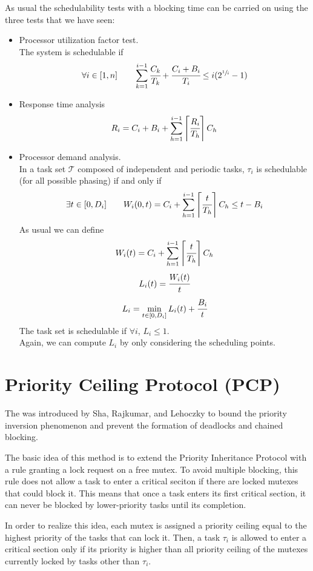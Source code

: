 As usual the schedulability tests with a blocking time can be carried on using the three tests that we have seen:
\begin{itemize}
    \item Processor utilization factor test.\\
    The system is schedulable if
    \[\forall i \in [1,n]\qquad \sum_{k=1}^{i-1}\cfrac{C_k}{T_k} + \cfrac{C_i + B_i}{T_i} \le i(2^{\sfrac{1}{i}} - 1)\]
    \item Response time analysis
    \[R_i = C_i + B_i + \sum_{h=1}^{i-1}\left\lceil \cfrac{R_i}{T_h} \right\rceil C_h\]
    \item Processor demand analysis.\\
    In a task set $\mathcal{T}$ composed of independent and periodic tasks, $\tau_i$ is schedulable (for all possible phasing) if and only if
    \[\exists t\in [0,D_i]\qquad W_i(0,t) = C_i + \sum_{h=1}^{i-1} \left\lceil \cfrac{t}{T_h} \right\rceil C_h \le t-B_i\]
    As usual we can define
    \[W_i(t) =C_i + \sum_{h=1}^{i-1} \left\lceil \cfrac{t}{T_h} \right\rceil C_h\]
    \[L_i(t) = \cfrac{W_i(t)}{t}\]
    \[L_i = \min_{t\in [0,D_i]}L_i(t) + \cfrac{B_i}{t}\]
    The task set is schedulable if $\forall i$, $L_i\le 1$.\\
    Again, we can compute $L_i$ by only considering the scheduling points.
\end{itemize}

\section{Priority Ceiling Protocol (PCP)} %
The  was introduced by Sha, Rajkumar, and Lehoczky to bound the priority inversion phenomenon and prevent the formation of deadlocks and chained blocking.

The basic idea of this method is to extend the Priority Inheritance Protocol with a rule granting a lock request on a free mutex. To avoid multiple blocking, this rule does not allow a task to enter a critical seciton if there are locked mutexes that could block it. This means that once a task enters its first critical section, it can never be blocked by lower-priority tasks until its completion.

In order to realize this idea, each mutex is assigned a priority ceiling equal to the highest priority of the tasks that can lock it. Then, a task $\tau_i$ is allowed to enter a critical section only if its priority is higher than all priority ceiling of the mutexes currently locked by tasks other than $\tau_i$.

